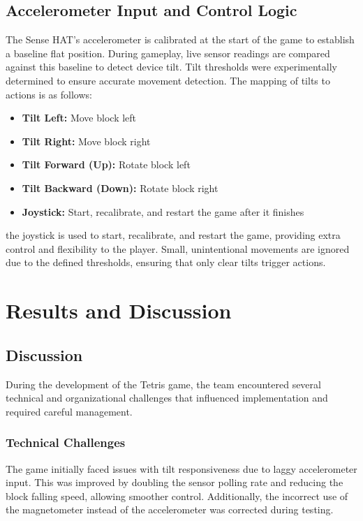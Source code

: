 \documentclass[12pt]{report}
\begin{document}
\section{Accelerometer Input and Control Logic}
The Sense HAT's accelerometer is calibrated at the start of the game to establish a baseline flat position. During gameplay, live sensor readings are compared against this baseline to detect device tilt. Tilt thresholds were experimentally determined to ensure accurate movement detection. The mapping of tilts to actions is as follows:

\begin{itemize}
    \item \textbf{Tilt Left:} Move block left
    \item \textbf{Tilt Right:} Move block right
    \item \textbf{Tilt Forward (Up):} Rotate block left
    \item \textbf{Tilt Backward (Down):} Rotate block right
    \item \textbf{Joystick:} Start, recalibrate, and restart the game after it finishes
\end{itemize}

 the joystick is used to start, recalibrate, and restart the game, providing extra control and flexibility to the player. Small, unintentional movements are ignored due to the defined thresholds, ensuring that only clear tilts trigger actions.

\chapter{Results and Discussion}

\section{Discussion}

During the development of the Tetris game, the team encountered several technical and organizational challenges that influenced implementation and required careful management.

\subsection{Technical Challenges}

The game initially faced issues with tilt responsiveness due to laggy accelerometer input. This was improved by doubling the sensor polling rate and reducing the block falling speed, allowing smoother control. Additionally, the incorrect use of the magnetometer instead of the accelerometer was corrected during testing.  
\end{document}
